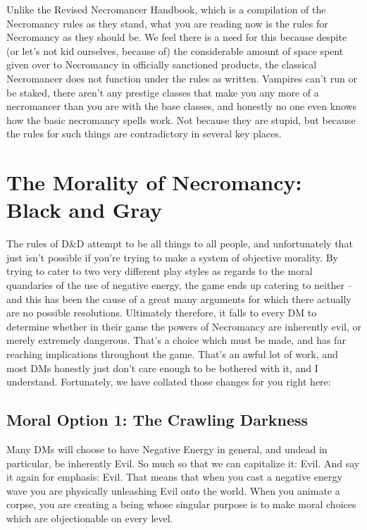 
Unlike the Revised Necromancer Handbook, which is a compilation of the Necromancy rules as they stand, what you are reading now is the rules for Necromancy as they should be. We feel there is a need for this because despite (or let's not kid ourselves, because of) the considerable amount of space spent given over to Necromancy in officially sanctioned products, the classical Necromancer does not function under the rules as written. Vampires can't run or be staked, there aren't any prestige classes that make you any more of a necromancer than you are with the base classes, and honestly no one even knows how the basic necromancy spells work. Not because they are stupid, but because the rules for such things are contradictory in several key places.

\section{The Morality of Necromancy: Black and Gray}

The rules of D\&D attempt to be all things to all people, and unfortunately that just isn't possible if you're trying to make a system of objective morality. By trying to cater to two very different play styles as regards to the moral quandaries of the use of negative energy, the game ends up catering to neither -- and this has been the cause of a great many arguments for which there actually are no possible resolutions. Ultimately therefore, it falls to every DM to determine whether in their game the powers of Necromancy are inherently evil, or merely extremely dangerous. That's a choice which must be made, and has far reaching implications throughout the game. That's an awful lot of work, and most DMs honestly just don't care enough to be bothered with it, and I understand. Fortunately, we have collated those changes for you right here:

\subsection{Moral Option 1: The Crawling Darkness}

Many DMs will choose to have Negative Energy in general, and undead in particular, be inherently Evil. So much so that we can capitalize it: Evil. And say it again for emphasis: Evil. That means that when you cast a negative energy wave you are physically unleashing Evil onto the world. When you animate a corpse, you are creating a being whose singular purpose is to make moral choices which are objectionable on every level.

